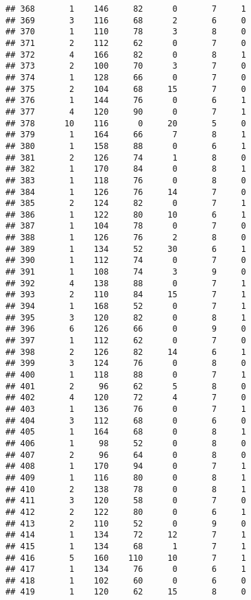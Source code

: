 \documentclass[
]{article}
\begin{document}
\begin{verbatim}
## 368       1    146     82      0       7     1
## 369       3    116     68      2       6     0
## 370       1    110     78      3       8     0
## 371       2    112     62      0       7     0
## 372       4    166     82      0       8     1
## 373       2    100     70      3       7     0
## 374       1    128     66      0       7     0
## 375       2    104     68     15       7     0
## 376       1    144     76      0       6     1
## 377       4    120     90      0       7     1
## 378      10    116      0     20       5     0
## 379       1    164     66      7       8     1
## 380       1    158     88      0       6     1
## 381       2    126     74      1       8     0
## 382       1    170     84      0       8     1
## 383       1    118     76      0       8     0
## 384       1    126     76     14       7     0
## 385       2    124     82      0       7     1
## 386       1    122     80     10       6     1
## 387       1    104     78      0       7     0
## 388       1    126     76      2       8     0
## 389       1    134     52     30       6     1
## 390       1    112     74      0       7     0
## 391       1    108     74      3       9     0
## 392       4    138     88      0       7     1
## 393       2    110     84     15       7     1
## 394       1    168     52      0       7     1
## 395       3    120     82      0       8     1
## 396       6    126     66      0       9     0
## 397       1    112     62      0       7     0
## 398       2    126     82     14       6     1
## 399       3    124     76      0       8     0
## 400       1    118     88      0       7     1
## 401       2     96     62      5       8     0
## 402       4    120     72      4       7     0
## 403       1    136     76      0       7     1
## 404       3    112     68      0       6     0
## 405       1    164     68      0       8     1
## 406       1     98     52      0       8     0
## 407       2     96     64      0       8     0
## 408       1    170     94      0       7     1
## 409       1    116     80      0       8     1
## 410       2    138     78      0       8     1
## 411       3    120     58      0       7     0
## 412       2    122     80      0       6     1
## 413       2    110     52      0       9     0
## 414       1    134     72     12       7     1
## 415       1    134     68      1       7     1
## 416       5    160    110     10       7     1
## 417       1    134     76      0       6     1
## 418       1    102     60      0       6     0
## 419       1    120     62     15       8     0

\end{verbatim}
\end{document}
